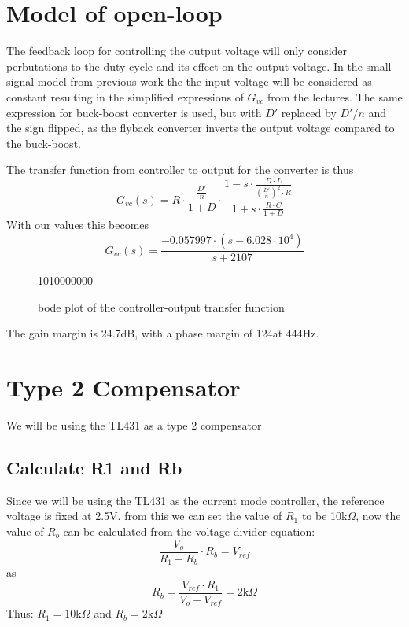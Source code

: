 \section{Model of open-loop}
The feedback loop for controlling the output voltage will only consider perbutations to the duty cycle and its effect on the output voltage. In the small signal model from previous work the the input voltage will be considered as constant resulting in the simplified expressions of $G_{vc}$ from the lectures. The same expression for buck-boost converter is used, but with $D'$ replaced by $D'/n$ and the sign flipped, as the flyback converter inverts the output voltage compared to the buck-boost.

The transfer function from controller to output for the converter is thus
\[
G_{vc}(s) = R\cdot \frac{\frac{D'}{n}}{1+D}\cdot\frac{1-s\cdot \frac{D\cdot L}{(\frac{D'}{n})^2 \cdot R}}{1+s\cdot \frac{R\cdot C}{1+D}}
\]
With our values this becomes
\[
G_{vc}(s)=\frac{-0.057997\cdot (s - 6.028\cdot 10^4)}{s+2107}
\]
\begin{figure}[H]
    \centering
    {10}{10000000}
    \caption{bode plot of the controller-output transfer function}
    \label{fig:bp1}
\end{figure}

The gain margin is 24.7dB, with a phase margin of 124\degree at 444Hz.

\section{Type 2 Compensator}
We will be using the TL431 as a type 2 compensator
\subsection{Calculate R1 and Rb}
Since we will be using the TL431 as the current mode controller, the reference voltage is fixed at 2.5V. from this we can set the value of $R_1$ to be 10k$\Omega$, now the value of $R_b$ can be calculated from the voltage divider equation:
\[
\frac{V_o}{R_1 + R_b} \cdot R_b = V_{ref}
\]
as
\[
R_b = \frac{V_{ref}\cdot R_1}{V_o - V_{ref}} = 2\text{k}\Omega
\]
Thus: $R_1 = 10\text{k}\Omega$ and $R_b = 2\text{k}\Omega$

